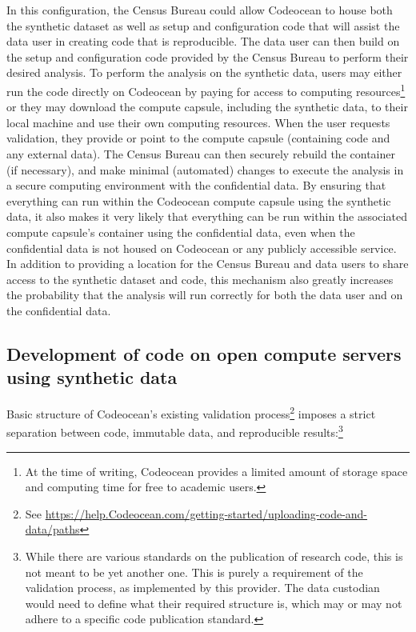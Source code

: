 \documentclass[]{hdsr}
\begin{document}
In this configuration, the Census Bureau could allow Codeocean to house both the synthetic dataset as well as
setup and configuration code that will assist the data user in creating code that is reproducible. The data
user can then build on the setup and configuration code provided by the Census Bureau to perform their
desired analysis. To perform the analysis on the synthetic data, users may either run the code directly on
Codeocean by paying for access to computing resources\footnote{At the time of writing, Codeocean  provides a limited amount of storage space and computing time for free to academic users.} or they may download the compute capsule, including the synthetic data, to their local
machine and use their own computing resources. When the user requests validation, they provide or point to the compute capsule (containing code and any external data). The Census Bureau can then  securely rebuild the container (if necessary), and make minimal (automated) changes to execute the analysis in a
secure computing environment with the confidential data. By ensuring that everything can
run within the Codeocean compute capsule using the synthetic data, it also makes it very likely that everything can
be run within the associated compute capsule's container using the confidential data, even when the confidential data is not housed on Codeocean or any publicly accessible service.
In addition to providing a location for the Census Bureau and data users to share access to the synthetic
dataset and code, this mechanism also greatly increases the probability that the analysis will run correctly for both the data user and on the
confidential data. 



\subsection{Development of code on open compute servers using synthetic data}

Basic structure of Codeocean's existing validation process\footnote{See \url{https://help.Codeocean.com/getting-started/uploading-code-and-data/paths}} imposes a strict separation between code, immutable data, and reproducible results:\footnote{While there are various standards on the publication of research code, this is not meant to be yet another one. This is purely a requirement of the validation process, as implemented by this provider. The data custodian would need to define what their required structure is, which may or may not adhere to a specific code publication standard.}
\end{document}
